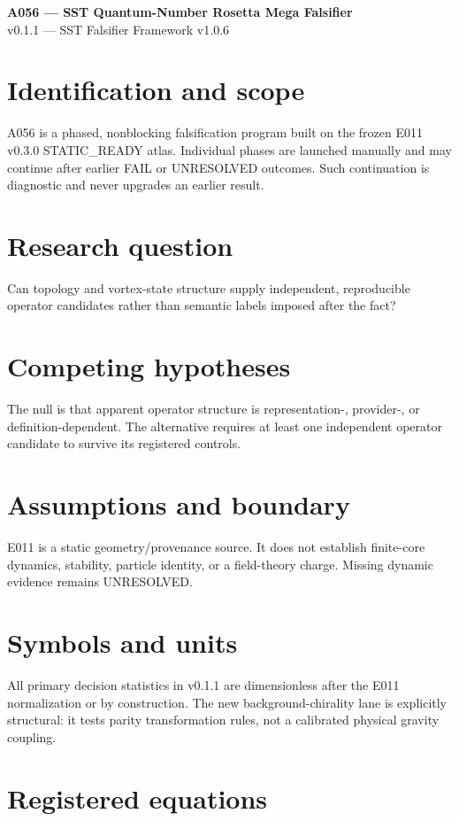 \documentclass[11pt]{article}
\begin{document}
\begin{center}{\Large\bfseries A056 --- SST Quantum-Number Rosetta Mega Falsifier}\\[3pt]
{\large v0.1.1 --- SST Falsifier Framework v1.0.6}\end{center}
\section{Identification and scope}
A056 is a phased, nonblocking falsification program built on the frozen E011 v0.3.0 STATIC\_READY atlas. Individual phases are launched manually and may continue after earlier FAIL or UNRESOLVED outcomes. Such continuation is diagnostic and never upgrades an earlier result.
\section{Research question}
Can topology and vortex-state structure supply independent, reproducible operator candidates rather than semantic labels imposed after the fact?
\section{Competing hypotheses}
The null is that apparent operator structure is representation-, provider-, or definition-dependent. The alternative requires at least one independent operator candidate to survive its registered controls.
\section{Assumptions and boundary}
E011 is a static geometry/provenance source. It does not establish finite-core dynamics, stability, particle identity, or a field-theory charge. Missing dynamic evidence remains UNRESOLVED.
\section{Symbols and units}
All primary decision statistics in v0.1.1 are dimensionless after the E011 normalization or by construction. The new background-chirality lane is explicitly structural: it tests parity transformation rules, not a calibrated physical gravity coupling.
\section{Registered equations}
\end{document}
